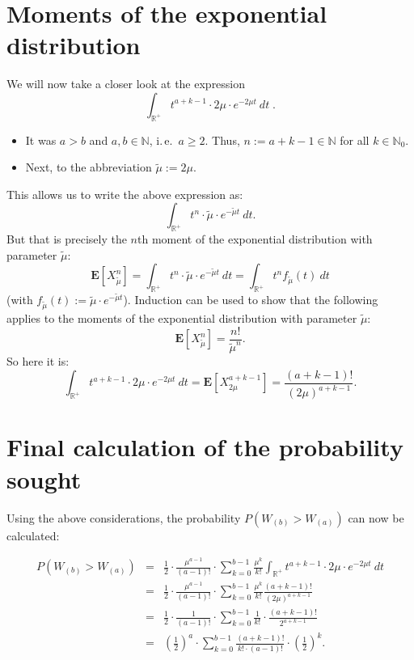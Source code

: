 \documentclass[a4paper,11pt,oneside]{article}
\begin{document}
\section{Moments of the exponential distribution}

We will now take a closer look at the expression
$$
\int_{\mathbb{R}^+}t^{a+k-1}\cdot2\mu\cdot e^{-2\mu t}~dt\;.
$$

\begin{itemize}
\item It was $a>b$ and $a,b\in\mathbb{N}$, i.\,e.\ $a\ge2$. Thus, $n:=a+k-1\in\mathbb{N}$ for all $k\in\mathbb{N}_0$.
\item Next, to the abbreviation $\tilde\mu:=2\mu$.
\end{itemize}

This allows us to write the above expression as:
$$
\int_{\mathbb{R}^+}t^{n}\cdot\tilde\mu\cdot e^{-\tilde\mu t}~dt.
$$
But that is precisely the $n$th moment of the exponential distribution with parameter $\tilde\mu$:
$$
\mathbf{E}[X_{\tilde\mu}^n]=
\int_{\mathbb{R}^+}t^{n}\cdot\tilde\mu\cdot e^{-\tilde\mu t}~dt=
\int_{\mathbb{R}^+}t^{n} f_{\tilde\mu}(t)~dt
$$
(with $f_{\tilde\mu}(t):=\tilde\mu\cdot e^{-\tilde\mu t}$). Induction can be used to show that the following applies to the moments of the exponential distribution with parameter $\tilde\mu$:
$$
\mathbf{E}[X_{\tilde\mu}^n]=\frac{n!}{\tilde\mu^n}.
$$
So here it is:
$$
\int_{\mathbb{R}^+}t^{a+k-1}\cdot2\mu\cdot e^{-2\mu t}~dt=
\mathbf{E}[X_{2\mu}^{a+k-1}]=\frac{(a+k-1)!}{(2\mu)^{a+k-1}}.
$$



\section{Final calculation of the probability sought}

Using the above considerations, the probability $P(W_{(b)}>W_{(a)})$ can now be calculated:

\begin{eqnarray*}
P(W_{(b)}>W_{(a)})&=&
\frac{1}{2}\cdot\frac{\mu^{a-1}}{(a-1)!}\cdot\sum_{k=0}^{b-1} \frac{\mu^k}{k!}\int_{\mathbb{R}^+}t^{a+k-1}\cdot2\mu\cdot e^{-2\mu t}~dt\\
~&=& \frac{1}{2}\cdot\frac{\mu^{a-1}}{(a-1)!}\cdot\sum_{k=0}^{b-1} \frac{\mu^k}{k!} \frac{(a+k-1)!}{(2\mu)^{a+k-1}}\\
~&=& \frac{1}{2}\cdot\frac{1}{(a-1)!}\cdot\sum_{k=0}^{b-1}\frac{1}{k!}\cdot\frac{(a+k-1)!}{2^{a+k-1}}\\
~&=& \left(\frac{1}{2}\right)^a\cdot\sum_{k=0}^{b-1}\frac{(a+k-1)!}{k!\cdot(a-1)!}\cdot\left(\frac{1}{2}\right)^k.
\end{eqnarray*}
\end{document}
